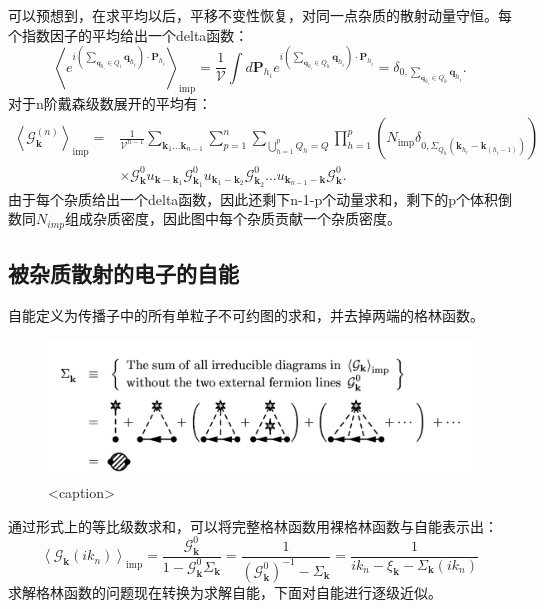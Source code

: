 \documentclass[10pt,openany]{book}
\theoremstyle{thmstyle} %
\theoremstyle{defstyle} %
\theoremstyle{prostyle} %
\begin{document}
可以预想到，在求平均以后，平移不变性恢复，对同一点杂质的散射动量守恒。每个指数因子的平均给出一个delta函数：
\begin{equation}
  \left\langle e^{i\left(\sum_{\mathbf{q}_{h_i} \in Q_i} \mathbf{q}_{h_i}\right) \cdot \mathbf{P}_{h_i}}\right\rangle_{\mathrm{imp}}=\frac{1}{\mathcal{V}} \int d \mathbf{P}_{h_i} e^{i\left(\sum_{\mathbf{q}_{h_i} \in Q_h} \mathbf{q}_{h_i}\right) \cdot \mathbf{P}_{h_i}}=\delta_{0, \sum_{\mathbf{q}_{h_i} \in Q_h} \mathbf{q}_{h_i}} .
\end{equation}
对于n阶戴森级数展开的平均有：
\begin{equation}
  \begin{aligned}
    \left\langle\mathcal{G}_{\mathbf{k}}^{(n)}\right\rangle_{\mathrm{imp}}= & \frac{1}{\mathcal{V}^{n-1}} \sum_{\mathbf{k}_1 \ldots \mathbf{k}_{n-1}} \sum_{p=1}^n \sum_{\bigcup_{h=1}^p Q_h=Q} \prod_{h=1}^p\left(N_{\mathrm{imp}} \delta_{0, \Sigma_{Q_h}\left(\mathbf{k}_{h_i}-\mathbf{k}_{\left(h_i-1\right)}\right)}\right) \\
    & \times \mathcal{G}_{\mathbf{k}}^0 u_{\mathbf{k}-\mathbf{k}_1} \mathcal{G}_{\mathbf{k}_1}^0 u_{\mathbf{k}_1-\mathbf{k}_2} \mathcal{G}_{\mathbf{k}_2}^0 \ldots u_{\mathbf{k}_{n-1}-\mathbf{k}} \mathcal{G}_{\mathbf{k}}^0 .
    \end{aligned}
\end{equation}
由于每个杂质给出一个delta函数，因此还剩下n-1-p个动量求和，剩下的p个体积倒数同$ N_{imp} $组成杂质密度，因此图中每个杂质贡献一个杂质密度。
\subsection*{被杂质散射的电子的自能}
自能定义为传播子中的所有单粒子不可约图的求和，并去掉两端的格林函数。
\begin{figure}[htbp]
  \centering
  \includegraphics*[scale=0.7]{Figures/selfenergy.png}
  \caption{<caption>}
  \label{<label>}
\end{figure}
通过形式上的等比级数求和，可以将完整格林函数用裸格林函数与自能表示出：
\begin{equation}
  \left\langle\mathcal{G}_{\mathbf{k}}\left(i k_n\right)\right\rangle_{\mathrm{imp}}=\frac{\mathcal{G}_{\mathbf{k}}^0}{1-\mathcal{G}_{\mathbf{k}}^0 \Sigma_{\mathbf{k}}}=\frac{1}{\left(\mathcal{G}_{\mathbf{k}}^0\right)^{-1}-\Sigma_{\mathbf{k}}}=\frac{1}{i k_n-\xi_{\mathbf{k}}-\Sigma_{\mathbf{k}}\left(i k_n\right)}
\end{equation}
求解格林函数的问题现在转换为求解自能，下面对自能进行逐级近似。\\
\end{document}
